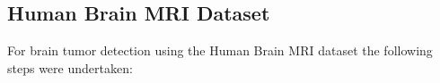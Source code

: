 



\subsection{Human Brain MRI Dataset}

For brain tumor detection using the Human Brain MRI dataset the following steps were undertaken:

